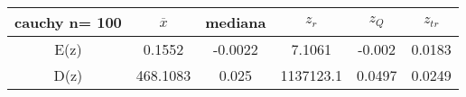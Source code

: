 \begin{tabular}{|c|c|c|c|c|c|}
\hline
cauchy n= 100& $\overline{x}$ & mediana & $z_r$ & $z_Q$ & $z_{tr}$ \\ \hline
E(z) & 0.1552 & -0.0022 & 7.1061 & -0.002 & 0.0183 \\ \hline
D(z) & 468.1083 & 0.025 & 1137123.1 & 0.0497 & 0.0249 \\ \hline
\end{tabular}
